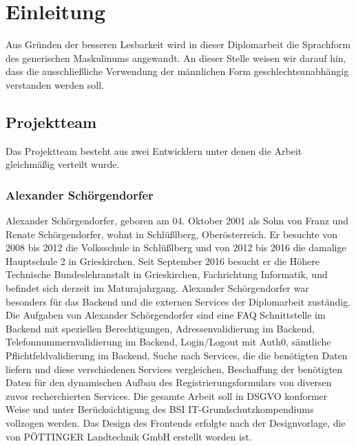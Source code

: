 \chapter{Einleitung} \label{sec:einleitung}
Aus Gründen der besseren Lesbarkeit wird in dieser Diplomarbeit die Sprachform des generischen Maskulinums angewandt. An dieser Stelle weisen wir darauf hin, dass die ausschließliche Verwendung der männlichen Form geschlechtsunabhängig verstanden werden soll.
\section{Projektteam}
Das Projektteam besteht aus zwei Entwicklern unter denen die Arbeit gleichmäßig verteilt wurde.
\subsection{Alexander Schörgendorfer}
Alexander Schörgendorfer, geboren am 04. Oktober 2001 als Sohn von Franz und Renate Schörgendorfer, wohnt in Schlüßlberg, Oberösterreich. Er besuchte von 2008 bis 2012 die Volksschule in Schlüßlberg und von 2012 bis 2016 die damalige Hauptschule 2 in Grieskirchen. Seit September 2016 besucht er die Höhere Technische Bundeslehranstalt in Grieskirchen, Fachrichtung Informatik, und befindet sich derzeit im Maturajahrgang. Alexander Schörgendorfer war besonders für das Backend und die externen Services der Diplomarbeit zuständig.\\
Die Aufgaben von Alexander Schörgendorfer sind eine FAQ Schnittstelle im Backend mit speziellen Berechtigungen, Adressenvalidierung im Backend, Telefonnummernvalidierung im Backend, Login/Logout mit Auth0, sämtliche Pflichtfeldvalidierung im Backend, Suche nach Services, die die benötigten Daten liefern und diese verschiedenen Services vergleichen, Beschaffung der benötigten Daten für den dynamischen Aufbau des Registrierungsformulars von diversen zuvor recherchierten Services. Die gesamte Arbeit soll in DSGVO konformer Weise und unter Berücksichtigung des BSI IT-Grundschutzkompen\-diums vollzogen werden. Das Design des Frontends erfolgte nach der Designvorlage, die von PÖTTINGER Landtechnik GmbH erstellt worden ist.

\newpage

